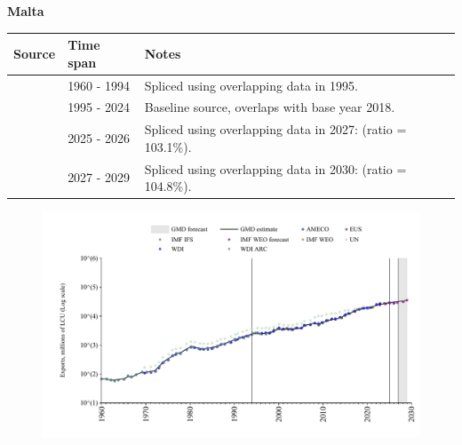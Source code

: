 \documentclass[12pt,a4paper,landscape]{article}
\begin{document}
\begin{adjustbox}{max totalsize={\paperwidth}{\paperheight},center}
\begin{minipage}[t][\textheight][t]{\textwidth}
\vspace*{0.5cm}
{}
\begin{center}
{\Large\bfseries Malta}
\end{center}
\vspace{0.5cm}
\begin{table}[H]
\centering
\small
\begin{tabular}{|l|l|l|}
\hline
\textbf{Source} & \textbf{Time span} & \textbf{Notes} \\
\hline
\rowcolor{white}\cite{AMECO}& 1960 - 1994 &Spliced using overlapping data in 1995.\\
\rowcolor{lightgray}\cite{EUS}& 1995 - 2024 &Baseline source, overlaps with base year 2018.\\
\rowcolor{white}\cite{AMECO}& 2025 - 2026 &Spliced using overlapping data in 2027: (ratio = 103.1\%).\\
\rowcolor{lightgray}\cite{IMF_WEO_forecast}& 2027 - 2029 &Spliced using overlapping data in 2030: (ratio = 104.8\%).\\
\hline
\end{tabular}
\end{table}
\begin{figure}[H]
\centering
\includegraphics[width=\textwidth,height=0.6\textheight,keepaspectratio]{graphs/MLT_exports.pdf}
\end{figure}
\end{minipage}
\end{adjustbox}
\end{document}
